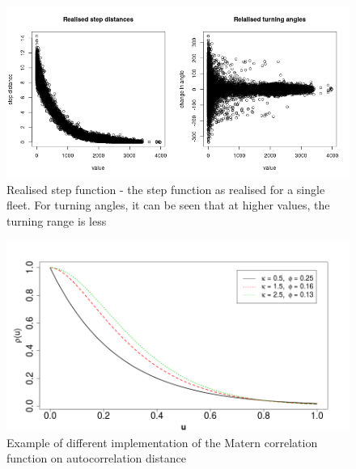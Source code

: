 \documentclass[review]{elsarticle}
\begin{document}
\begin{figure}[!ht]
	\includegraphics[width = \linewidth]{../tests/plots/step_function}
	\caption{Realised step function - the step function as realised for a
		single fleet. For turning angles, it can be seen that at higher
	values, the turning range is less}
	\label{fig:15}
\end{figure}	

\begin{figure}[!ht]
	\includegraphics[width = \linewidth]{./Plots/Matern}
	\caption{Example of different implementation of the Matern correlation
	function on autocorrelation distance}
	\label{fig:16}
\end{figure}	
\end{document}
